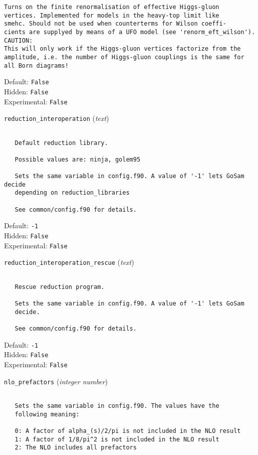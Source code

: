 \begin{basedescript}{\desclabelstyle{\pushlabel}}
\begin{verbatim}
Turns on the finite renormalisation of effective Higgs-gluon
vertices. Implemented for models in the heavy-top limit like
smehc. Should not be used when counterterms for Wilson coeffi-
cients are supplyed by means of a UFO model (see 'renorm_eft_wilson').
CAUTION:
This will only work if the Higgs-gluon vertices factorize from the
amplitude, i.e. the number of Higgs-gluon couplings is the same for
all Born diagrams!
\end{verbatim}
Default: \verb|False|
\\Hidden: \verb|False|
\\Experimental: \verb|False|
\\\item[\colorbox{gray!30}{\texttt{reduction\_interoperation}}] (\textit{text})
\begin{verbatim}

   Default reduction library.

   Possible values are: ninja, golem95

   Sets the same variable in config.f90. A value of '-1' lets GoSam decide
   depending on reduction_libraries

   See common/config.f90 for details.
\end{verbatim}
Default: \verb|-1|
\\Hidden: \verb|False|
\\Experimental: \verb|False|
\\\item[\colorbox{gray!30}{\texttt{reduction\_interoperation\_rescue}}] (\textit{text})
\begin{verbatim}

   Rescue reduction program.

   Sets the same variable in config.f90. A value of '-1' lets GoSam
   decide.

   See common/config.f90 for details.
\end{verbatim}
Default: \verb|-1|
\\Hidden: \verb|False|
\\Experimental: \verb|False|
\\\item[\colorbox{gray!30}{\texttt{nlo\_prefactors}}] (\textit{integer number})
\begin{verbatim}

   Sets the same variable in config.f90. The values have the
   following meaning:

   0: A factor of alpha_(s)/2/pi is not included in the NLO result
   1: A factor of 1/8/pi^2 is not included in the NLO result
   2: The NLO includes all prefactors


\end{verbatim}
\end{basedescript}
